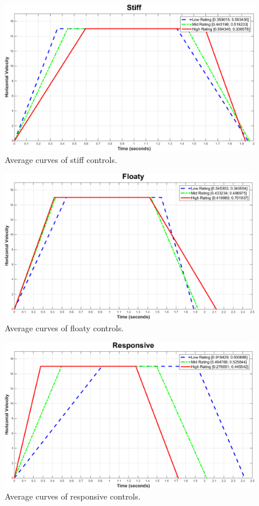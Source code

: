 \begin{figure}[htbp]
\centering
\includegraphics[width=0.9\columnwidth]{Pics/Curves/Stiff_curve}
\caption{Average curves of stiff controls.}
\label{fig:curve_stiff}
\end{figure}

\begin{figure}[htbp]
\centering
\includegraphics[width=0.9\columnwidth]{Pics/Curves/Floaty_curve}
\caption{Average curves of floaty controls.}
\label{fig:curve_floaty}
\end{figure}

\begin{figure}[htbp]
\centering
\includegraphics[width=0.9\columnwidth]{Pics/Curves/Responsive_curve}
\caption{Average curves of responsive controls.}
\label{fig:curve_responsive}
\end{figure}

